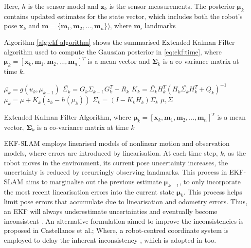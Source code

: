 Here, $h$ is the sensor model and $\mathbf{z}_k$ is the sensor measurements. The posterior $\mathbf{\mu}_k$ contains updated estimates for the state vector, which includes both the robot’s pose $\mathbf{x}_k$ and $\mathbf{m}=\{\mathbf{m}_1, \mathbf{m}_2,\dots{}, \mathbf{m}_n\}$), where $\mathbf{m}_{i}$ landmarks


Algorithm \ref{alg:ekf-algorithm} shows the summarised Extended Kalman Filter algorithm used to compute the Gaussian posterior in \ref{eq:ekf:time}, where $\mathbf{\mu}_k = [\mathbf{x}_k, \mathbf{m}_1, \mathbf{m}_2, \dots{}, \mathbf{m}_n]^T $ is a mean vector and $\mathbf{\Sigma}_k$ is a co-variance matrix at time $k$. 


\begin{algorithm}[H]
	\SetAlgoLined
	    \(\bar{\mu_k} = g(u_k, \mu_{k-1})\)\;
	    \(\bar{\Sigma_k} = G_k \Sigma_{k-1} G^{T}_{k} + R_k\)\;
    	\(K_k = \bar{\Sigma_k} H^T_k(H_k\bar{\Sigma_k}H^T_k + Q_k)^{-1}\)\;
	    \(\mu_k = \bar{\mu} + K_k(z_k-h(\bar{\mu_k}))\)\;
    	\(\Sigma_k = (I -K_k H_k)\bar{\Sigma_k}\)\;
	\Return \(\mu, \Sigma\)
	\caption[Extended Kalman Filter Algorithm]{Extended Kalman Filter Algorithm\cite{Thrun2006}, where $\mathbf{\mu}_k = [\mathbf{x}_k, \mathbf{m}_1, \mathbf{m}_2, \dots{}, \mathbf{m}_n]^T $ is a mean vector, $\mathbf{\Sigma}_k$ is a co-variance matrix at time $k$}\label{alg:ekf-algorithm}
\end{algorithm}

EKF-SLAM employs linearised models of nonlinear motion and observation models, where errors are introduced by linearisation. At each time step, $k$, as the robot moves in the environment, its current pose uncertainty increases, the uncertainty is reduced by recurringly observing landmarks. This process in EKF-SLAM aims to marginalise out the previous estimate $\mathbf{\mu}_{k-1}$, to only incorporate the most recent linearisation errors into the current state $\mathbf{\mu}_{k}$. This process helps limit pose errors that accumulate due to linearisation and odometry errors. Thus, an EKF will always underestimate uncertainties and eventually become inconsistent \cite{CASTELLANOS2004716, 4058955}. An alternative formulation aimed to improve the inconsistencies is proposed in Castellanos et al.; Where, a robot-centred coordinate system is employed to delay the inherent inconsistency \cite{CASTELLANOS2004716, Castellanos2007}, which is adopted in \cite{5509248, Civera2010} too.

